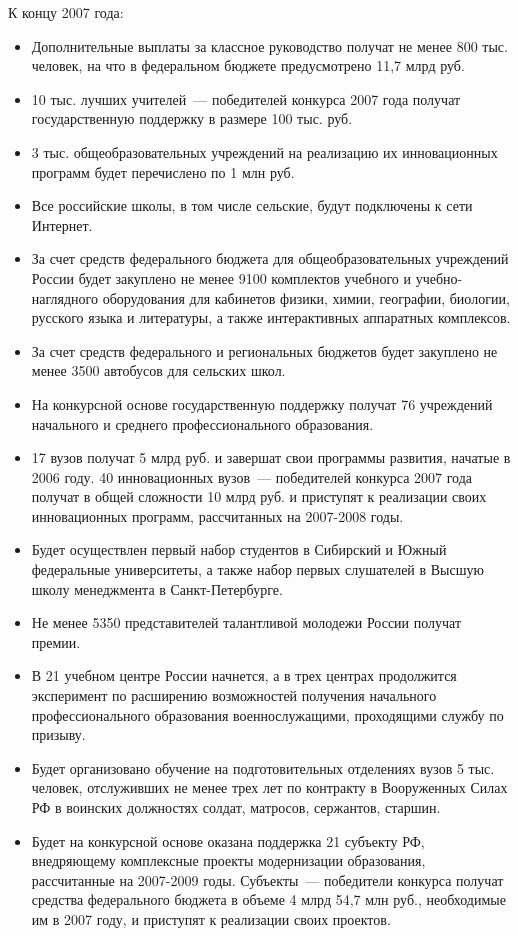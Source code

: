 \documentclass[article, 12pt, russian, oneside]{ncc}
\begin{document}
К концу 2007 года:

\begin{itemize}
\item Дополнительные выплаты за классное руководство получат не менее
  800 тыс. человек, на что в федеральном бюджете предусмотрено 11,7
  млрд руб.
\item 10 тыс. лучших учителей~--- победителей конкурса 2007 года
  получат государственную поддержку в размере 100 тыс. руб.
\item 3 тыс. общеобразовательных учреждений на реализацию их
  инновационных программ будет перечислено по 1 млн руб.
\item Все российские школы, в том числе сельские, будут подключены к
  сети Интернет.
\item За счет средств федерального бюджета для общеобразовательных
  учреждений России будет закуплено не менее 9100 комплектов учебного
  и учебно-наглядного оборудования для кабинетов физики, химии,
  географии, биологии, русского языка и литературы, а также
  интерактивных аппаратных комплексов.
\item За счет средств федерального и региональных бюджетов будет
  закуплено не менее 3500 автобусов для сельских школ.
\item На конкурсной основе государственную поддержку получат 76
  учреждений начального и среднего профессионального образования.
\item 17 вузов получат 5 млрд руб. и завершат свои программы развития,
  начатые в 2006 году. 40 инновационных вузов~--- победителей конкурса
  2007 года получат в общей сложности 10 млрд руб. и приступят к
  реализации своих инновационных программ, рассчитанных на 2007-2008
  годы.
\item Будет осуществлен первый набор студентов в Сибирский и Южный
  федеральные университеты, а также набор первых слушателей в Высшую
  школу менеджмента в Санкт-Петербурге.
\item Не менее 5350 представителей талантливой молодежи России получат
  премии.
\item В 21 учебном центре России начнется, а в трех центрах
  продолжится эксперимент по расширению возможностей получения
  начального профессионального образования военнослужащими,
  проходящими службу по призыву.
\item Будет организовано обучение на подготовительных отделениях вузов
  5 тыс. человек, отслуживших не менее трех лет по контракту в
  Вооруженных Силах РФ в воинских должностях солдат, матросов,
  сержантов, старшин.
\item Будет на конкурсной основе оказана поддержка 21 субъекту РФ,
  внедряющему комплексные проекты модернизации образования,
  рассчитанные на 2007-2009 годы. Субъекты~--- победители конкурса
  получат средства федерального бюджета в объеме 4 млрд 54,7 млн руб.,
  необходимые им в 2007 году, и приступят к реализации своих проектов.
\end{itemize}
\end{document}
